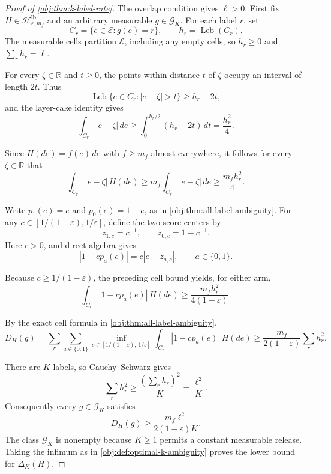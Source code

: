 \documentclass[11pt]{article}
\begin{document}
\begin{proof}[Proof of \cref{obj:thm:k-label-rate}]
The overlap condition gives \(\ell>0\). First fix \(H\in\mathcal H^{\mathrm{lb}}_{\varepsilon,m_f}\) and an arbitrary measurable \(g\in\mathcal G_K\). For each label \(r\), set
\[
C_r=\{e\in\mathcal E:g(e)=r\},
\qquad h_r=\operatorname{Leb}(C_r).
\]
The measurable cells partition \(\mathcal E\), including any empty cells, so \(h_r\geq0\) and \(\sum_r h_r=\ell\). %

For every \(\zeta\in\mathbb R\) and \(t\geq0\), the points within distance \(t\) of \(\zeta\) occupy an interval of length \(2t\). Thus
\[
\operatorname{Leb}\{e\in C_r:|e-\zeta|>t\}\geq h_r-2t,
\]
and the layer-cake identity gives
\[
\int_{C_r}|e-\zeta|\,de
\geq\int_0^{h_r/2}(h_r-2t)\,dt
=\frac{h_r^2}{4}.
\] %

Since \(H(de)=f(e)\,de\) with \(f\geq m_f\) almost everywhere, it follows for every \(\zeta\in\mathbb R\) that
\[
\int_{C_r}|e-\zeta|\,H(de)
\geq m_f\int_{C_r}|e-\zeta|\,de
\geq \frac{m_fh_r^2}{4}.
\] %

Write \(p_1(e)=e\) and \(p_0(e)=1-e\), as in \cref{obj:thm:all-label-ambiguity}. For any \(c\in[1/(1-\varepsilon),1/\varepsilon]\), define the two score centers by
\[
z_{1,c}=c^{-1},\qquad z_{0,c}=1-c^{-1}.
\]
Here \(c>0\), and direct algebra gives
\[
|1-cp_a(e)|=c|e-z_{a,c}|,
\qquad a\in\{0,1\}.
\] %

Because \(c\geq1/(1-\varepsilon)\), the preceding cell bound yields, for either arm,
\[
\int_{C_r}|1-cp_a(e)|\,H(de)
\geq \frac{m_fh_r^2}{4(1-\varepsilon)}.
\] %

By the exact cell formula in \cref{obj:thm:all-label-ambiguity},
\[
D_H(g)
=\sum_r\sum_{a\in\{0,1\}}
\inf_{c\in[1/(1-\varepsilon),\,1/\varepsilon]}
\int_{C_r}|1-cp_a(e)|\,H(de)
\geq \frac{m_f}{2(1-\varepsilon)}\sum_r h_r^2.
\] %

There are \(K\) labels, so Cauchy–Schwarz gives
\[
\sum_r h_r^2
\geq \frac{(\sum_r h_r)^2}{K}
=\frac{\ell^2}{K}.
\] %
Consequently every \(g\in\mathcal G_K\) satisfies
\[
D_H(g)\geq\frac{m_f\ell^2}{2(1-\varepsilon)K}.
\] %
The class \(\mathcal G_K\) is nonempty because \(K\geq1\) permits a constant measurable release. Taking the infimum as in \cref{obj:def:optimal-k-ambiguity} proves the lower bound for \(\Delta_K(H)\). %


\end{proof}
\end{document}
